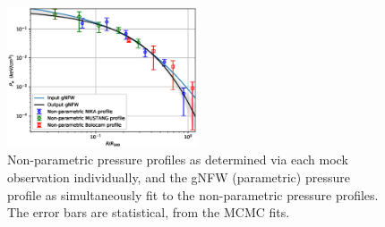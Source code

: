 \documentclass[twocolumn,traditabstract]{aa}
\begin{document}
\begin{figure}[!h]
  \centering
  \includegraphics[width=0.5\textwidth]{NIKA_ml_deproj_figs/Virt_Joint_gNFW_Power_Virt_11011111_2500S_500B_100W_gNFW_pressure_w_NP_pts_p16cosmo_input_vs_output_v2.eps}
  \caption{Non-parametric pressure profiles as determined via each mock observation individually,
    and the gNFW (parametric) pressure profile as simultaneously fit to the non-parametric pressure profiles.
    The error bars are statistical, from the MCMC fits.}
  \label{fig:virt_robustness}
\end{figure}


\end{document}
